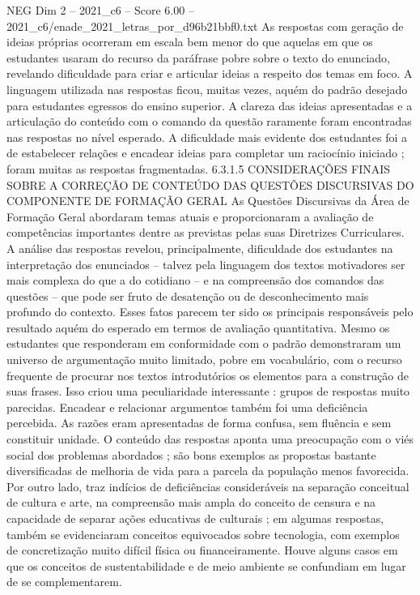 \begin{textsample}{NEG Dim 2 – 2021\_c6 – Score 6.00 – 2021\_c6/enade\_2021\_letras\_por\_d96b21bbf0.txt}
As respostas com geração de ideias próprias ocorreram em escala bem menor do que aquelas em que os estudantes usaram do recurso da paráfrase pobre sobre o texto do enunciado, revelando dificuldade para criar e articular ideias a respeito dos temas em foco.
A linguagem utilizada nas respostas ficou, muitas vezes, aquém do padrão desejado para estudantes egressos do ensino superior.
A clareza das ideias apresentadas e a articulação do conteúdo com o comando da questão raramente foram encontradas nas respostas no nível esperado.
A dificuldade mais evidente dos estudantes foi a de estabelecer relações e encadear ideias para completar um raciocínio iniciado ; foram muitas as respostas fragmentadas. 6.3.1.5 CONSIDERAÇÕES FINAIS SOBRE A CORREÇÃO DE CONTEÚDO DAS QUESTÕES DISCURSIVAS DO COMPONENTE DE FORMAÇÃO GERAL As Questões Discursivas da Área de Formação Geral abordaram temas atuais e proporcionaram a avaliação de competências importantes dentre as previstas pelas suas Diretrizes Curriculares.
A análise das respostas revelou, principalmente, dificuldade dos estudantes na interpretação dos enunciados – talvez pela linguagem dos textos motivadores ser mais complexa do que a do cotidiano – e na compreensão dos comandos das questões – que pode ser fruto de desatenção ou de desconhecimento mais profundo do contexto.
Esses fatos parecem ter sido os principais responsáveis pelo resultado aquém do esperado em termos de avaliação quantitativa.
Mesmo os estudantes que responderam em conformidade com o padrão demonstraram um universo de argumentação muito limitado, pobre em vocabulário, com o recurso frequente de procurar nos textos introdutórios os elementos para a construção de suas frases.
Isso criou uma peculiaridade interessante : grupos de respostas muito parecidas.
Encadear e relacionar argumentos também foi uma deficiência percebida.
As razões eram apresentadas de forma confusa, sem fluência e sem constituir unidade.
O conteúdo das respostas aponta uma preocupação com o viés social dos problemas abordados ; são bons exemplos as propostas bastante diversificadas de melhoria de vida para a parcela da população menos favorecida.
Por outro lado, traz indícios de deficiências consideráveis na separação conceitual de cultura e arte, na compreensão mais ampla do conceito de censura e na capacidade de separar ações educativas de culturais ; em algumas respostas, também se evidenciaram conceitos equivocados sobre tecnologia, com exemplos de concretização muito difícil física ou financeiramente.
Houve alguns casos em que os conceitos de sustentabilidade e de meio ambiente se confundiam em lugar de se complementarem.

\end{textsample}
